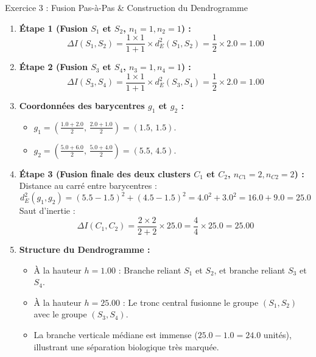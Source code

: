 \documentclass[11pt,a4paper]{article}
\begin{document}
\begin{solutionbox}{Exercice 3 : Fusion Pas-à-Pas \& Construction du Dendrogramme}
\begin{enumerate}[label=\textbf{\alph*.}]
  \item \textbf{Étape 1 (Fusion $S_1$ et $S_2$, $n_1=1, n_2=1$) :}
  \begin{equation*}
    \Delta I(S_1, S_2) = \frac{1 \times 1}{1 + 1} \times d_E^2(S_1, S_2) = \frac{1}{2} \times 2.0 = \mathbf{1.00}
  \end{equation*}

  \item \textbf{Étape 2 (Fusion $S_3$ et $S_4$, $n_3=1, n_4=1$) :}
  \begin{equation*}
    \Delta I(S_3, S_4) = \frac{1 \times 1}{1 + 1} \times d_E^2(S_3, S_4) = \frac{1}{2} \times 2.0 = \mathbf{1.00}
  \end{equation*}

  \item \textbf{Coordonnées des barycentres $g_1$ et $g_2$ :}
  \begin{itemize}
    \item $g_1 = \left( \frac{1.0 + 2.0}{2}, \, \frac{2.0 + 1.0}{2} \right) = \mathbf{(1.5, \, 1.5)}$.
    \item $g_2 = \left( \frac{5.0 + 6.0}{2}, \, \frac{5.0 + 4.0}{2} \right) = \mathbf{(5.5, \, 4.5)}$.
  \end{itemize}

  \item \textbf{Étape 3 (Fusion finale des deux clusters $C_1$ et $C_2$, $n_{C1}=2, n_{C2}=2$) :}
  Distance au carré entre barycentres :
  \begin{equation*}
    d_E^2(g_1, g_2) = (5.5 - 1.5)^2 + (4.5 - 1.5)^2 = 4.0^2 + 3.0^2 = 16.0 + 9.0 = 25.0
  \end{equation*}
  Saut d'inertie :
  \begin{equation*}
    \Delta I(C_1, C_2) = \frac{2 \times 2}{2 + 2} \times 25.0 = \frac{4}{4} \times 25.0 = \mathbf{25.00}
  \end{equation*}

  \item \textbf{Structure du Dendrogramme :}
  \begin{itemize}
    \item À la hauteur $h = 1.00$ : Branche reliant $S_1$ et $S_2$, et branche reliant $S_3$ et $S_4$.
    \item À la hauteur $h = 25.00$ : Le tronc central fusionne le groupe $(S_1, S_2)$ avec le groupe $(S_3, S_4)$.
    \item La branche verticale médiane est immense ($25.0 - 1.0 = 24.0$ unités), illustrant une séparation biologique très marquée.
  \end{itemize}
\end{enumerate}
\end{solutionbox}
\end{document}
